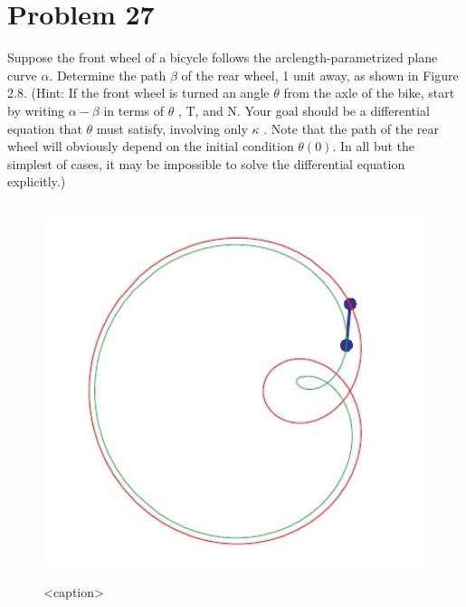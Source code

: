 \documentclass[
	12pt, %
]{fphw}
\theoremstyle{plain}
\begin{document}
\section*{Problem 27}
\begin{problem}
     Suppose the front wheel of a bicycle follows the arclength-parametrized plane curve $\alpha$. Determine the
     path $\beta$ of the rear wheel, 1 unit away, as shown in Figure 2.8. (Hint: If the front wheel is turned an
     angle $\theta$ from the axle of the bike, start by writing $\alpha - \beta$ in terms of $\theta$ , T, and N. Your goal should be
     a differential equation that $\theta$ must satisfy, involving only $\kappa$ . Note that the path of the rear wheel will
     obviously depend on the initial condition $\theta(0)$. In all but the simplest of cases, it may be impossible to
     solve the differential equation explicitly.)
\end{problem}
\begin{figure}[htbp]
     \centering
     \includegraphics[width=\linewidth, width=12cm, height=11cm]{question_27.jpg}
     \caption{<caption>}
     \label{<label>}
\end{figure}
\end{document}
